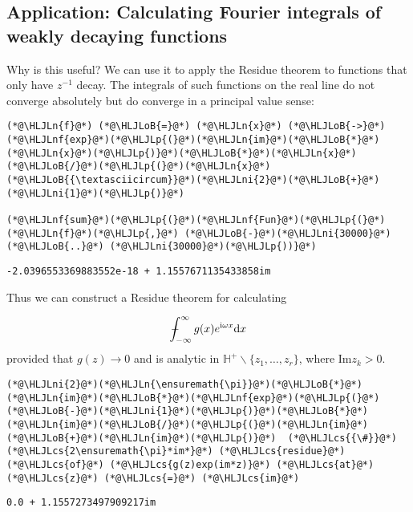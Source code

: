 \documentclass[12pt,a4paper]{article}
\newcommand{\HLJLn}[1]{#1}
\newcommand{\HLJLnf}[1]{\textcolor[RGB]{66,102,213}{#1}}
\newcommand{\HLJLni}[1]{\textcolor[RGB]{59,151,46}{#1}}
\newcommand{\HLJLoB}[1]{\textcolor[RGB]{102,102,102}{\textbf{#1}}}
\newcommand{\HLJLp}[1]{#1}
\newcommand{\HLJLcs}[1]{\textcolor[RGB]{153,153,119}{\textit{#1}}}
\def\D{ {\rm d} }
\def\I{ {\rm i} }
\def\Xint#1{ \mathchoice
   {\XXint\displaystyle\textstyle{#1} }%
   {\XXint\textstyle\scriptstyle{#1} }%
   {\XXint\scriptstyle\scriptscriptstyle{#1} }%
   {\XXint\scriptscriptstyle\scriptscriptstyle{#1} }%
   \!\int}
\def\XXint#1#2#3{ {\setbox0=\hbox{$#1{#2#3}{\int}$}
     \vcenter{\hbox{$#2#3$}}\kern-.5\wd0} }
\def\dashint{\Xint-}
\def\infdashint{\dashint_{-\infty}^\infty}
\def\dx{\D x}
\begin{document}
\subsection{Application: Calculating Fourier integrals of weakly decaying functions}
Why is this useful? We can use it to apply the Residue theorem to functions that only have $z^{-1}$ decay. The integrals of such functions on the real line do not converge absolutely but do converge in a principal value sense:


\begin{lstlisting}
(*@\HLJLn{f}@*) (*@\HLJLoB{=}@*) (*@\HLJLn{x}@*) (*@\HLJLoB{->}@*) (*@\HLJLnf{exp}@*)(*@\HLJLp{(}@*)(*@\HLJLn{im}@*)(*@\HLJLoB{*}@*)(*@\HLJLn{x}@*)(*@\HLJLp{)}@*)(*@\HLJLoB{*}@*)(*@\HLJLn{x}@*)(*@\HLJLoB{/}@*)(*@\HLJLp{(}@*)(*@\HLJLn{x}@*)(*@\HLJLoB{{\textasciicircum}}@*)(*@\HLJLni{2}@*)(*@\HLJLoB{+}@*)(*@\HLJLni{1}@*)(*@\HLJLp{)}@*)

(*@\HLJLnf{sum}@*)(*@\HLJLp{(}@*)(*@\HLJLnf{Fun}@*)(*@\HLJLp{(}@*)(*@\HLJLn{f}@*)(*@\HLJLp{,}@*) (*@\HLJLoB{-}@*)(*@\HLJLni{30000}@*) (*@\HLJLoB{..}@*) (*@\HLJLni{30000}@*)(*@\HLJLp{))}@*)
\end{lstlisting}

\begin{lstlisting}
-2.0396553369883552e-18 + 1.1557671135433858im
\end{lstlisting}


Thus we can construct a Residue theorem for calculating

\[
\infdashint g(x) e^{\I \omega x} \dx
\]
provided that $g(z) \rightarrow 0$ and is analytic in ${\mathbb H}^+ \backslash \{z_1,\ldots,z_r \}$, where $\mathrm{Im } z_k > 0$.


\begin{lstlisting}
(*@\HLJLni{2}@*)(*@\HLJLn{\ensuremath{\pi}}@*)(*@\HLJLoB{*}@*)(*@\HLJLn{im}@*)(*@\HLJLoB{*}@*)(*@\HLJLnf{exp}@*)(*@\HLJLp{(}@*)(*@\HLJLoB{-}@*)(*@\HLJLni{1}@*)(*@\HLJLp{)}@*)(*@\HLJLoB{*}@*)(*@\HLJLn{im}@*)(*@\HLJLoB{/}@*)(*@\HLJLp{(}@*)(*@\HLJLn{im}@*)(*@\HLJLoB{+}@*)(*@\HLJLn{im}@*)(*@\HLJLp{)}@*)  (*@\HLJLcs{{\#}}@*) (*@\HLJLcs{2\ensuremath{\pi}*im*}@*) (*@\HLJLcs{residue}@*) (*@\HLJLcs{of}@*) (*@\HLJLcs{g(z)exp(im*z)}@*) (*@\HLJLcs{at}@*) (*@\HLJLcs{z}@*) (*@\HLJLcs{=}@*) (*@\HLJLcs{im}@*)
\end{lstlisting}

\begin{lstlisting}
0.0 + 1.1557273497909217im
\end{lstlisting}
\end{document}
